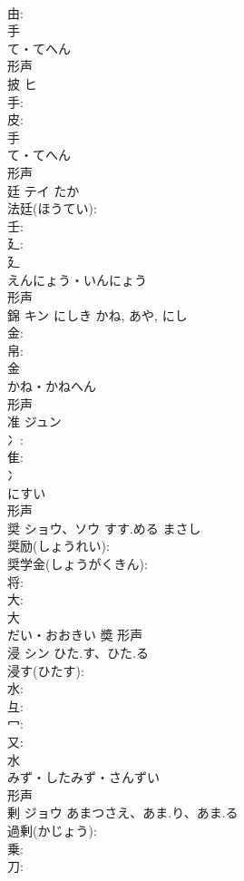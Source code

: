 \documentclass[8pt]{extreport}
\begin{document}
\begin{CJK}{UTF8}{min}
\\	由: 
\\	手	
\\	て・てへん	
\\	形声 
\\	披	ヒ			
\\	手: 
\\	皮: 
\\	手	
\\	て・てへん	
\\	形声 
\\	廷	テイ		たか	
\\	法廷(ほうてい): 
\\	壬: 
\\	廴: 
\\	廴	
\\	えんにょう・いんにょう	
\\	形声 
\\	錦	キン	にしき	かね, あや, にし	
\\	金: 
\\	帛: 
\\	金	
\\	かね・かねへん	
\\	形声 
\\	准	ジュン			
\\	冫: 
\\	隹: 
\\	冫	
\\	にすい	
\\	形声 
\\	奨	ショウ、ソウ	すす.める	まさし	
\\	奨励(しょうれい): 
\\	奨学金(しょうがくきん): 
\\	将: 
\\	大: 
\\	大	
\\	だい・おおきい	奬	形声 
\\	浸	シン	ひた.す、ひた.る		
\\	浸す(ひたす): 
\\	水: 
\\	彑: 
\\	冖: 
\\	又: 
\\	水	
\\	みず・したみず・さんずい	
\\	形声 
\\	剰	ジョウ	あまつさえ、あま.り、あま.る		
\\	過剰(かじょう): 
\\	乗: 
\\	刀: 

\end{CJK}
\end{document}
